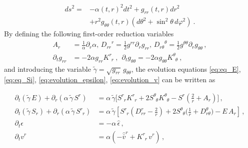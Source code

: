 \documentclass[prd,aps,twocolumn,floats,floatfix,nofootinbib,superscriptaddress] {revtex4-1}
\begin{document}
\begin{align}
    ds^2 =&-\alpha(t,r)^2 dt^2 + g_{rr}(t,r)dr^2\nonumber \\ & +r^2g_{\theta \theta}(t,r) \left(d\theta^2+\sin^2\theta\, d\varphi^2\right) ~.
\label{isometric}
\end{align}
By defining the following first-order reduction variables 
\begin{align}
A_{r}&=\tfrac{1}{\alpha}\partial_{r}\alpha,\,{D_{rr}}^{r}=\tfrac{1}{2}g^{rr}\partial_{r}g_{rr},\,{D_{r\theta}}^{\theta}=\tfrac{1}{2}g^{\theta\theta}\partial_{r}g_{\theta\theta}\,,\nonumber\\
\partial_{t}g_{rr} &= -2\alpha g_{rr}K^{r}_{\phantom{r}r}~,~~
\partial_{t}g_{\theta\theta} =-2\alpha g_{\theta\theta}K^{\theta}_{\phantom{\theta}\theta}~,
\end{align}
and introducing the variable $\tilde{\gamma}=\sqrt{g_{rr}}\,g_{\theta\theta}$, the evolution equations \eqref{eq:eq_E}, \eqref{eq:eq_Si}, \eqref{eq:evolution_epsilon}, \eqref{eq:evolution_v} can be written as
\begin{widetext}
    \begin{align}
    \partial_t(\tilde{\gamma}\,E)+\partial_r(\alpha\,\tilde{\gamma}\,S^r )&=\alpha \,\tilde{\gamma}\big[S^r_{\phantom{r}r}K^r_{\phantom{r}r} +2S^\theta_{\phantom{\theta}\theta} K^\theta_{\phantom{\theta}\theta} - S^r\left(\tfrac{2}{r}+A_r\right)\big]\,,\\
    \partial_t(\tilde{\gamma}\,S_r)+\partial_r(\alpha\,\tilde{\gamma}\,S^r_{\phantom{r}r})&=\alpha \,\tilde{\gamma}\left[S^r_{\phantom{r}r}(D_{rr}^r-\tfrac{2}{r})+2S^\theta_{\phantom{\theta}\theta} \big(\tfrac{1}{r}+D_{r \theta}^\theta \big)-E\,A_r\right]\,, \\
    \partial_t\epsilon &=-\alpha\,\hat\epsilon\,, \label{eq:evol_epsilon_sph}\\
    \partial_t v^r &=\alpha(-\hat{\bar v}^r+K^r_{\phantom{r}r}\,v^r)\,, \label{eq:evol_vel_r_tmp}
\end{align}
\end{widetext}
\end{document}
